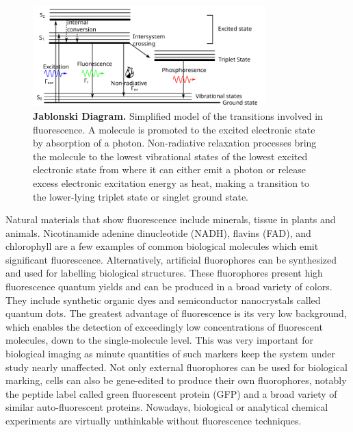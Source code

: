 \begin{figure}
	\centering
	\includegraphics[width=0.8\textwidth]{jablonski}
	\caption{\textbf{Jablonski Diagram.} Simplified model of the transitions involved in fluorescence. A molecule is promoted to the excited electronic state by absorption of a photon. Non-radiative relaxation processes bring the molecule to the lowest vibrational states of the lowest excited electronic state from where it can either emit a photon or release excess electronic excitation energy as heat, making a transition to the lower-lying triplet state or singlet ground state.}
	\label{fig:jablonski}
\end{figure}

Natural materials that show fluorescence include minerals, tissue in plants and animals.
Nicotinamide adenine dinucleotide (NADH), flavins (FAD), and chlorophyll are a few examples of common biological molecules which emit significant fluorescence.\cite{blacker2014separating,siano1989nadh,genty1989the}
Alternatively, artificial fluorophores can be synthesized and used for labelling biological structures. These fluorophores present high fluorescence quantum yields and can be produced in a broad variety of colors. They include synthetic organic dyes and semiconductor nanocrystals called quantum dots.\cite{atkinson1952the,alivisatos1996semiconductor}
The greatest advantage of fluorescence is its very low background, which enables the detection of exceedingly low concentrations of fluorescent molecules, down to the single-molecule level.
This was very important for biological imaging as minute quantities of such markers keep the system under study nearly unaffected.\cite{white1987an}
Not only external fluorophores can be used for biological marking, cells can also be gene-edited to produce their own fluorophores, notably the peptide label called green fluorescent protein (GFP) and a broad variety of similar auto-fluorescent proteins.\cite{tsien1998the,chalfie1994green}
Nowadays, biological or analytical chemical experiments are virtually unthinkable without fluorescence techniques.


